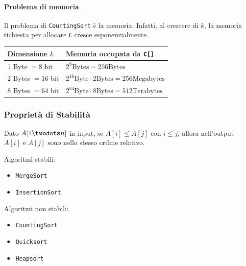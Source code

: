 \paragraph{Problema di memoria} Il problema di \texttt{CountingSort} è la memoria. 
Infatti, al crescere di $k$, la memoria richiesta per allocare \texttt{C} cresce esponenzialmente.
\begin{center}
    \begin{tabular}{|l|l|}
        \hline
        Dimensione $k$ & Memoria occupata da \texttt{C[]} \\
        \hline
        1 Byte $= 8$ bit & $2^8 \text{Bytes} = 256 \text{Bytes}$ \\
        2 Bytes $= 16$ bit & $2^{16} \text{Byte} \cdot 2 \text{Bytes} = 256 \text{Megabytes}$ \\
        8 Bytes $= 64$ bit & $2^{64} \text{Byte} \cdot 8 \text{Bytes} = 512 \text{Terabytes}$ \\
        \hline
    \end{tabular}
\end{center}

\subsubsection{Proprietà di Stabilità}
Dato $A[1 \twodots n]$ in input, se $A[i] \leq A[j]$ con $i \leq j$, allora nell'output $A[i]$ e $A[j]$ sono nello stesso ordine relativo.
\bigskip

Algoritmi stabili:
\begin{itemize}
	\item \texttt{MergeSort}
	\item \texttt{InsertionSort}
\end{itemize}
\bigskip

Algoritmi non stabili:
\begin{itemize}
	\item \texttt{CountingSort}
	\item \texttt{Quicksort}
	\item \texttt{Heapsort}
\end{itemize}